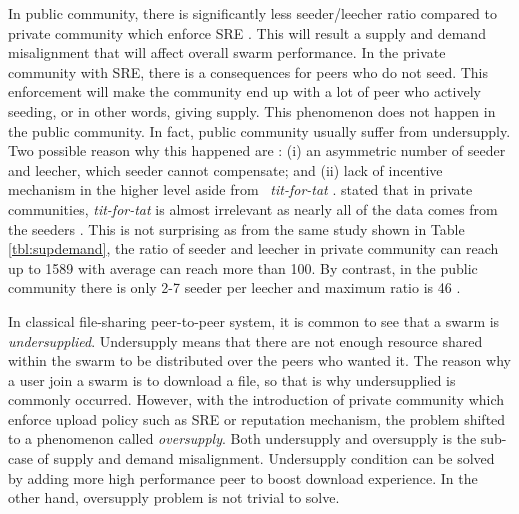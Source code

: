 In public community, there is significantly less seeder/leecher ratio compared to private community which enforce SRE \cite{2009:demandsupplyres:andrade,2010:pubpriv:meulpolder}. This will result a supply and demand misalignment that will affect overall swarm performance. In the private community with SRE, there is a consequences for peers who do not seed. This enforcement will make the community end up with a lot of peer who actively seeding, or in other words, giving supply. This phenomenon does not happen in the public community. In fact, public community usually suffer from undersupply. Two possible reason why this happened are : (i) an asymmetric number of seeder and leecher, which seeder cannot compensate; and (ii) lack of incentive mechanism in the higher level aside from \bt~\textit{tit-for-tat} \cite{2009:demandsupplyres:andrade}. \citeauthor{2010:pubpriv:meulpolder} stated that in private communities, \textit{tit-for-tat} is almost irrelevant as nearly all of the data comes from the seeders \cite{2010:pubpriv:meulpolder}. This is not surprising as from the same study shown in Table \ref{tbl:supdemand}, the ratio of seeder and leecher in private community can reach up to 1589 with average can reach more than 100. By contrast, in the public community there is only 2-7 seeder per leecher and maximum ratio is 46 \cite{2010:pubpriv:meulpolder}. 

In classical file-sharing peer-to-peer system, it is common to see that a swarm is \textit{undersupplied}. Undersupply means that there are not enough resource shared within the swarm to be distributed over the peers who wanted it. The reason why a user join a swarm is to download a file, so that is why undersupplied is commonly occurred. However, with the introduction of private community which enforce upload policy such as SRE or reputation mechanism, the problem shifted to a phenomenon called \textit{oversupply}. Both undersupply and oversupply is the sub-case of supply and demand misalignment. Undersupply condition can be solved by adding more high performance peer to boost download experience. In the other hand, oversupply problem is not trivial to solve.

